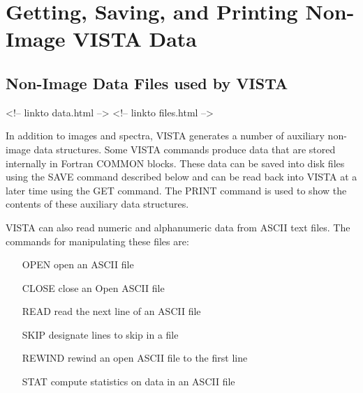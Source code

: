 \chapter{Getting, Saving, and Printing Non-Image VISTA Data} 

%
%

\section{Non-Image Data Files used by VISTA}
\begin{rawhtml}
<!-- linkto data.html -->
<!-- linkto files.html -->
\end{rawhtml}

In addition to images and spectra, VISTA generates a number of auxiliary
non-image data structures.  Some VISTA commands produce data that are
stored internally in Fortran COMMON blocks.  These data can be saved into
disk files using the SAVE command described below and can be read back into
VISTA at a later time using the GET command.  The PRINT command is used to
show the contents of these auxiliary data structures.

VISTA can also read numeric and alphanumeric data from ASCII text files.
The commands for manipulating these files are:
\begin{itemize}
  \item[OPEN]{open an ASCII file}
  \item[CLOSE]{close an Open ASCII file}
  \item[READ]{read the next line of an ASCII file}
  \item[SKIP]{designate lines to skip in a file}
  \item[REWIND]{rewind an open ASCII file to the first line}
  \item[STAT]{compute statistics on data in an ASCII file}
\end{itemize}


